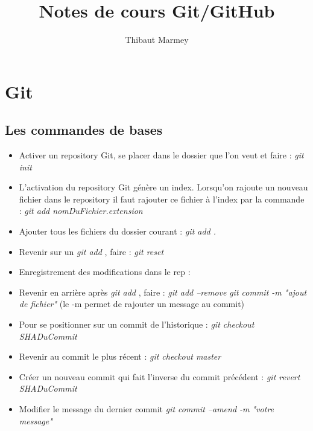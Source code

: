 \documentclass[12pt,a4paper]{article}
\author{Thibaut Marmey}
\title{Notes de cours Git/GitHub}
\begin{document}
	\maketitle

\begin{normalsize}
\tableofcontents
\end{normalsize}

\section{Git}
\subsection{Les commandes de bases}
\begin{itemize}
\item Activer un repository Git, se placer dans le dossier que l’on veut et faire : 
\newline \textit{git init }
\item L’activation du repository Git génère un index. Lorsqu’on rajoute un nouveau fichier dans le repository il faut rajouter ce fichier à l’index par la commande :
\newline \textit{git add nomDuFichier.extension}
\item Ajouter tous les fichiers du dossier courant :
\newline \textit{git add .}
\item Revenir sur un \textit{git add }, faire : \textit{git reset}
\item Enregistrement des modifications dans le rep :
\item Revenir en arrière après \textit{git add }, faire : \textit{git add --remove}
\newline \textit{git commit -m "ajout de fichier"} (le -m permet de rajouter un message au commit)
\item Pour se positionner sur un commit de l'historique :
\newline \textit{git checkout SHADuCommit}
\item Revenir au commit le plus récent : 
\newline \textit{git checkout master}
\item Créer un nouveau commit qui fait l'inverse du commit précédent :
\newline \textit{git revert SHADuCommit}
\item Modifier le message du dernier commit
\newline \textit{git commit --amend -m "votre message"}

\end{itemize}
\end{document}
